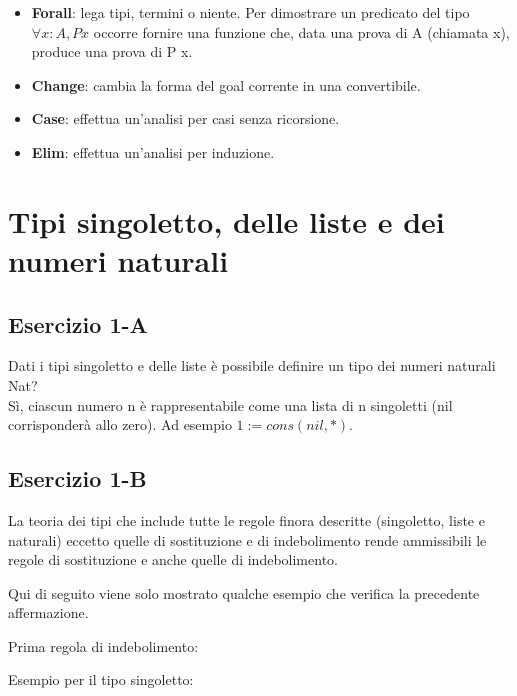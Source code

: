\begin{itemize}
\item \textbf{Forall}: lega tipi, termini o niente. Per dimostrare un predicato del tipo
$\forall x : A, P x$ occorre fornire una funzione che, data una prova di A (chiamata x),
produce una prova di P x.

\item \textbf{Change}: cambia la forma del goal corrente in una convertibile.

\item \textbf{Case}: effettua un'analisi per casi senza ricorsione.

\item \textbf{Elim}: effettua un'analisi per induzione.
\end{itemize}

\newpage
\section{Tipi singoletto, delle liste e dei numeri naturali}

\subsection{Esercizio 1-A}

Dati i tipi singoletto e delle liste è possibile definire un tipo dei numeri 
naturali Nat? \\

Sì, ciascun numero n è rappresentabile come una lista di n singoletti (nil
corrisponderà allo zero). Ad esempio $1 := cons(nil, *)$.

\subsection{Esercizio 1-B}

La teoria dei tipi che include tutte le regole finora descritte (singoletto,
liste e naturali) eccetto quelle di sostituzione e di indebolimento rende
ammissibili le regole di sostituzione e anche quelle di indebolimento.

Qui di seguito viene solo mostrato qualche esempio che verifica la precedente
affermazione.

Prima regola di indebolimento:

\begin{prooftree}
\end{prooftree}

Esempio per il tipo singoletto:

